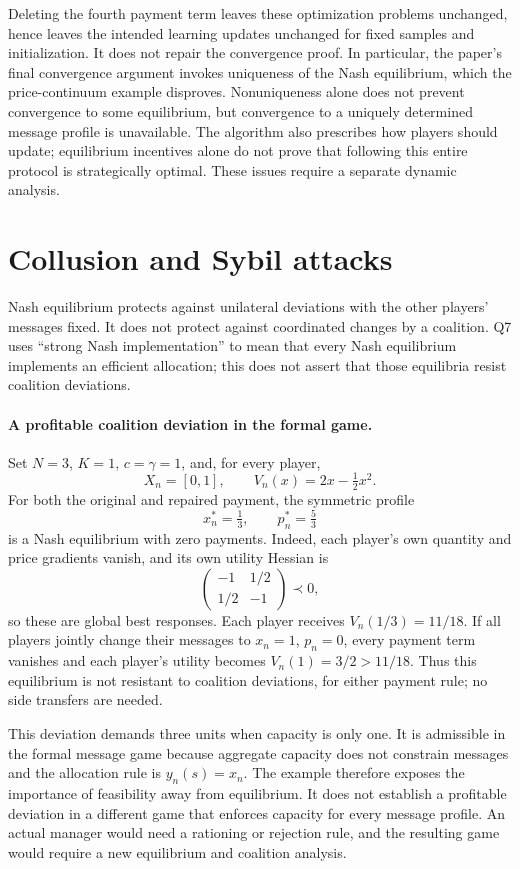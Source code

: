 \documentclass[11pt]{article}
\begin{document}
Deleting the fourth payment term leaves these optimization problems
unchanged, hence leaves the intended learning updates unchanged for fixed
samples and initialization. It does not repair the convergence proof.
In particular, the paper's final convergence argument invokes uniqueness
of the Nash equilibrium, which the price-continuum example disproves.
Nonuniqueness alone does not prevent convergence to some equilibrium,
but convergence to a uniquely determined message profile is unavailable.
The algorithm also prescribes how players should update; equilibrium
incentives alone do not prove that following this entire protocol is
strategically optimal. These issues require a separate dynamic analysis.

\section{Collusion and Sybil attacks}
Nash equilibrium protects against unilateral deviations with the other
players' messages fixed. It does not protect against coordinated changes
by a coalition. Q7 uses ``strong Nash implementation'' to mean that every
Nash equilibrium implements an efficient allocation; this does not assert
that those equilibria resist coalition deviations.

\paragraph{A profitable coalition deviation in the formal game.}
Set $N=3$, $K=1$, $c=\gamma=1$, and, for every player,
\[
 X_n=[0,1],\qquad V_n(x)=2x-\tfrac12x^2.
\]
For both the original and repaired payment, the symmetric profile
\[
 x_n^*=\tfrac13,\qquad p_n^*=\tfrac53
\]
is a Nash equilibrium with zero payments. Indeed, each player's own
quantity and price gradients vanish, and its own utility Hessian is
\[
 \begin{pmatrix}-1&1/2\\1/2&-1\end{pmatrix}\prec0,
\]
so these are global best responses. Each player receives
$V_n(1/3)=11/18$.
If all players jointly change their messages to $x_n=1$, $p_n=0$,
every payment term vanishes and each player's utility becomes
$V_n(1)=3/2>11/18$. Thus this equilibrium is not resistant to coalition
deviations, for either payment rule; no side transfers are needed.

This deviation demands three units when capacity is only one. It is
admissible in the formal message game because aggregate capacity does
not constrain messages and the allocation rule is $y_n(s)=x_n$.
The example therefore exposes the importance of feasibility away from
equilibrium. It does not establish a profitable deviation in a different
game that enforces capacity for every message profile. An actual manager
would need a rationing or rejection rule, and the resulting game would
require a new equilibrium and coalition analysis.
\end{document}
